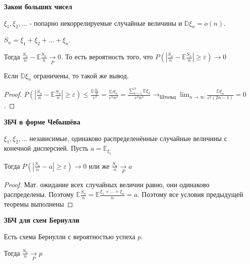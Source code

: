 \begin{theorem}
    \textbf{Закон больших чисел}

    $\xi_1, \xi_2, \ldots$ - попарно некоррелируемые случайные величины и 
    $\mathbb{D}\xi_n = o(n)$.

    $S_n = \xi_1 + \xi_2 + \ldots + \xi_n$. 
    
    Тогда $\frac{S_n}{n} - \mathbb{E}\frac{S_n}{n} \underset{P}{\rightarrow} 0$.
    То есть вероятность того, что $P(|\frac{S_n}{n} - \mathbb{E}\frac{S_n}{n}| \geqslant \varepsilon) \rightarrow 0$
\end{theorem}

\begin{consequence}
    Если $\mathbb{D}\xi_n$ ограничены, то такой же вывод.
\end{consequence}

\begin{proof}
    $P(\left |\frac{S_n}{n} - \mathbb{E}\frac{S_n}{n} \right | \geqslant \varepsilon) \leqslant \frac{\mathbb{D}\frac{S_n}{n}}{\varepsilon^2} = \frac{\mathbb{D}S_n}{\varepsilon^2n^2} = 
    \frac{\sum_{k = 1}^n \mathbb{D}\xi_k}{\varepsilon^2n^2} \rightarrow_{\text{Штольц}} \lim_{n \to \infty} \frac{\mathbb{D}\xi_n}{\varepsilon^2(2n - 1)} = 0$.
\end{proof}

\begin{consequence}
    \textbf{ЗБЧ в форме Чебышёва}

    $\xi_1, \xi_2, \ldots$ независимые, одинаково распределенённые случайные величины с конечной дисперсией.
    Пусть $a = \mathbb{E}_{\xi_1}$
    
    Тогда $P(\left | \frac{S_n}{n} - a \right | \geqslant \varepsilon) \rightarrow 0$ или же $\frac{S_n}{n} \underset{P}{\rightarrow} a$

    \begin{proof}
        Мат. ожидание всех случайных величин равно, они одинаково распределены. Поэтому 
        $\mathbb{E} \frac{S_n}{n} = \mathbb{E} \frac{\xi_1 + \ldots + \xi_n}{n} = a$. Поэтому все условия предыдущей 
        теоремы выполнены
    \end{proof}
\end{consequence}

\begin{consequence}
    \textbf{ЗБЧ для схем Бернулли}

    Есть схема Бернулли с вероятностью успеха $p$.

    Тогда $\frac{S_n}{n} \underset{P}{\rightarrow} p$
\end{consequence}

